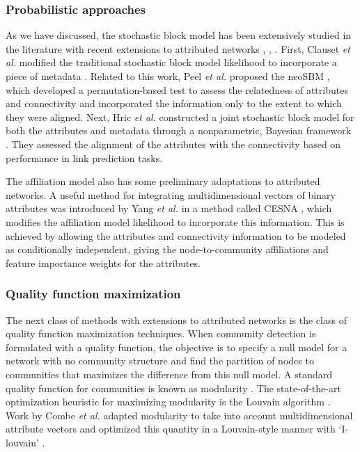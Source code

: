 \subsubsection{Probabilistic approaches}

As we have discussed, the stochastic block model has been extensively studied in the literature with recent extensions to attributed networks \cite{hric}, \cite{peel2017ground}, \cite{clauset}. First, Clauset \emph{et al.} modified the traditional stochastic block model likelihood to incorporate a piece of metadata \cite{clauset}. Related to this work, Peel \emph{et al.} proposed the neoSBM \cite{peel2017ground}, which developed a permutation-based test to assess the relatedness of attributes and connectivity and incorporated the information only to the extent to which they were aligned. Next, Hric \emph{et al.} constructed a joint stochastic block model for both the attributes and metadata through a nonparametric, Bayesian framework \cite{hric}. They assessed the alignment of the attributes with the connectivity based on performance in link prediction tasks. 

The affiliation model also has some preliminary adaptations to attributed networks. A useful method for integrating multidimensional vectors of binary attributes was introduced by Yang \emph{et al.} in a method called CESNA \cite{cesna}, which modifies the affiliation model likelihood to incorporate this information. This is achieved by allowing the attributes and connectivity information to be modeled as conditionally independent, giving the node-to-community affiliations and feature importance weights for the attributes.

\subsubsection{Quality function maximization}
The next class of methods with extensions to attributed networks is the class of quality function maximization techniques. When community detection is formulated with a quality function, the objective is to specify a null model for a network with no community structure and find the partition of nodes to communities that maximizes the difference from this null model. A standard quality function for communities is known as modularity \cite{newmanmodularity}. The state-of-the-art optimization heuristic for maximizing modularity is the Louvain algorithm \cite{blondel}. Work by Combe \emph{et al.} adapted modularity to take into account multidimensional attribute vectors and optimized this quantity in a Louvain-style manner with `I-louvain' \cite{ilouvain}. 

